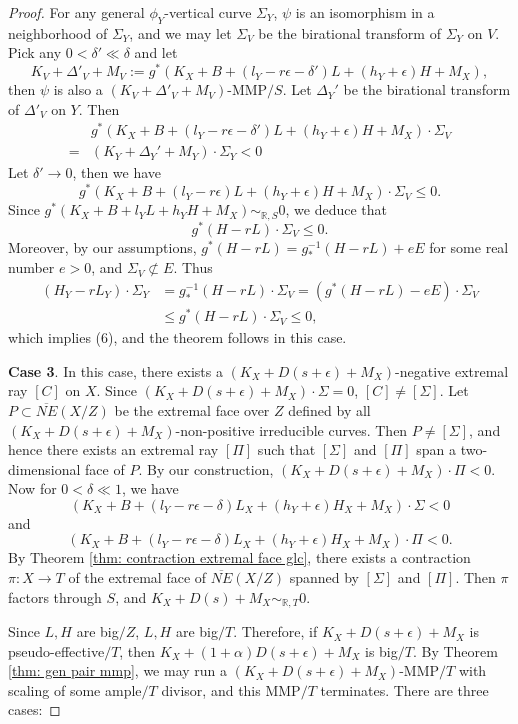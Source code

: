 \documentclass[11pt]{amsart}
\newcommand\wang[1]{\todo[color=blue!40]{#1}}
\numberwithin{equation}{section}
\newcommand{\Mm}{{\bf{M}}}
\newcommand{\Rr}{\mathbb{R}}
\theoremstyle{definition}
\theoremstyle{definition}
\theoremstyle{definition}
\begin{document}
\begin{proof}
For any general $\phi_Y$-vertical curve $\Sigma_Y$, $\psi$ is an isomorphism in a neighborhood of $\Sigma_Y$, and we may let $\Sigma_V$ be the birational transform of $\Sigma_Y$ on $V$. Pick any $0<\delta'\ll\delta$ and let
$$K_V+\Delta'_V+M_V:=g^*(K_X+B+(l_Y-r\epsilon-\delta')L+(h_Y+\epsilon)H+M_X),$$
then $\psi$ is also a $(K_V+\Delta'_V+M_V)$-MMP$/S$. Let $\Delta_Y'$ be the birational transform of $\Delta'_V$ on $Y$. Then
\begin{align*}
&g^*(K_X+B+(l_Y-r\epsilon-\delta')L+(h_Y+\epsilon)H+M_X)\cdot\Sigma_V\\
=&(K_Y+\Delta_Y'+M_Y)\cdot\Sigma_Y<0
\end{align*}
Let $\delta'\rightarrow 0$, then we have
$$g^*(K_X+B+(l_Y-r\epsilon)L+(h_Y+\epsilon)H+M_X)\cdot\Sigma_V\leq 0.$$
Since $g^*(K_X+B+l_YL+h_YH+M_X)\sim_{\mathbb R,S}0$, we deduce that
$$g^*(H-rL)\cdot\Sigma_V\leq 0.$$
Moreover, by our assumptions, $g^*(H-rL)=g^{-1}_*(H-rL)+eE$ for some real number $e>0$, and $\Sigma_V\not\subset E$. Thus
\begin{align*}
    (H_Y-rL_Y)\cdot\Sigma_Y&=g^{-1}_*(H-rL)\cdot\Sigma_V=(g^*(H-rL)-eE)\cdot\Sigma_V\\
    &\leq g^*(H-rL)\cdot\Sigma_V\leq 0,
\end{align*}
which implies (6), and the theorem follows in this case.

\medskip

\noindent\textbf{Case 3}. In this case,
 there exists a $(K_X+D(s+\epsilon)+M_X)$-negative extremal \wang{$(X,D(s+\epsilon),\Mm)$ may not be lc}ray $[C]$ on $X$. Since $(K_X+D(s+\epsilon)+M_X)\cdot\Sigma=0$, $[C]\not=[\Sigma]$. Let $P\subset\overline{NE}(X/Z)$ be the extremal face over $Z$ defined by all $(K_X+D(s+\epsilon)+M_X)$-non-positive irreducible curves. Then $P\not=[\Sigma]$, and hence there exists an extremal ray $[\Pi]$ such that $[\Sigma]$ and $[\Pi]$ span a two-dimensional face of $P$. By our construction, $(K_X+D(s+\epsilon)+M_X)\cdot\Pi<0$. Now for $0<\delta\ll 1$, we have
$$(K_X+B+(l_Y-r\epsilon-\delta)L_X+(h_Y+\epsilon)H_X+M_X)\cdot\Sigma<0$$
and
$$(K_X+B+(l_Y-r\epsilon-\delta)L_X+(h_Y+\epsilon)H_X+M_X)\cdot\Pi<0.$$
By Theorem \ref{thm: contraction extremal face glc}, there exists a contraction $\pi: X\rightarrow T$ of the extremal face of $\overline{NE}(X/Z)$ spanned by $[\Sigma]$ and $[\Pi]$. Then $\pi$ factors through $S$, and  $K_X+D(s)+M_X\sim_{\Rr,T}0$.

Since $L,H$ are big$/Z$, $L,H$ are big$/T$. Therefore, if $K_{X}+D(s+\epsilon)+M_X$ is pseudo-effective$/T$, then $K_X+(1+\alpha)D(s+\epsilon)+M_X$ is big$/T$. By Theorem \ref{thm: gen pair mmp}, we may run a $(K_{X}+D(s+\epsilon)+M_X)$-MMP$/T$ with scaling of some ample$/T$ divisor, and this MMP$/T$ terminates. There are three cases:


\end{proof}
\end{document}
